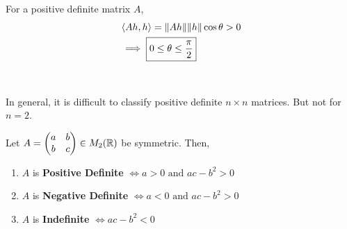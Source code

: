 \documentclass[../Analysis-3.tex]{subfiles}
\begin{document}
For a positive definite matrix $ A $,
\begin{align*}
   & \left\langle Ah, h \right\rangle = \norm{Ah}\norm{h}\cos{\theta} > 0 \\
   & \implies \boxed{0 \leq \theta \leq \frac{\pi}{2}}
\end{align*}

\

In general, it is difficult to classify positive definite $n \times n$ matrices. But not for $n = 2$.

\begin{Thm}{}{}
  Let $A = \begin{pmatrix}
      a & b \\
      b & c
    \end{pmatrix} \in M_2(\mathbb{R}) $ be symmetric. Then,
  \begin{enumerate}[label=(\roman*)]
    \item $A$ is \textbf{Positive Definite} $ \Longleftrightarrow a > 0 \text{ and } ac -b^2 >0 $ \label{charpd}
    \item $A$ is \textbf{Negative Definite} $ \Longleftrightarrow a < 0 \text{ and } ac -b^2 >0 $ \label{charnd}
    \item $A$ is \textbf{Indefinite} $ \Longleftrightarrow ac -b^2 <0 $ \label{charind}
  \end{enumerate}
\end{Thm}
\end{document}
